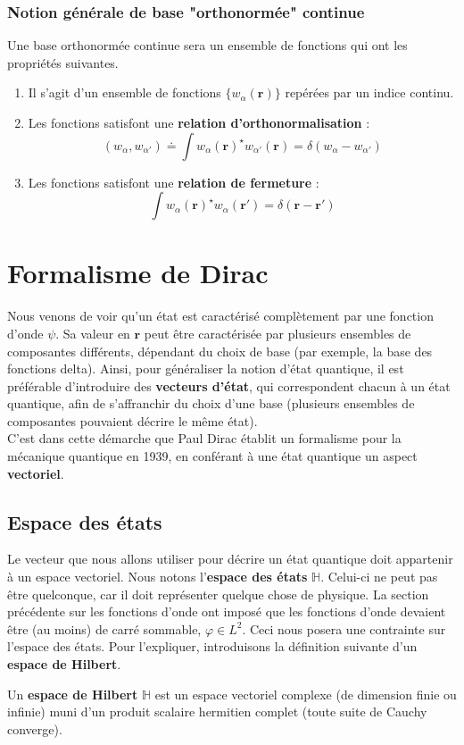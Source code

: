 \documentclass[../notesdecours.tex]{subfiles}
\begin{document}
\subsubsection{Notion générale de base "orthonormée" continue}
Une base orthonormée continue sera un ensemble de fonctions qui ont les propriétés suivantes.
\begin{enumerate}
\item Il s'agit d'un ensemble de fonctions $\{ w_\alpha(\bm{r})\}$ repérées par un indice continu. \\

\item Les fonctions satisfont une \textbf{relation d'orthonormalisation} :
$$(w_{\alpha}, w_{\alpha'}) \doteq \int w_{\alpha}(\bm{r})^\star w_{\alpha'}(\bm{r}) = \delta(w_{\alpha} - w_{\alpha'})$$

\item Les fonctions satisfont une \textbf{relation de fermeture} :
$$\int w_{\alpha}(\bm{r})^\star w_{\alpha}(\bm{r}') = \delta(\bm{r}-\bm{r}')$$
\end{enumerate}
\section{Formalisme de Dirac}
Nous venons de voir qu'un état est caractérisé complètement par une fonction d'onde $\psi$. Sa valeur en $\bm{r}$ peut être caractérisée par plusieurs ensembles de composantes différents, dépendant du choix de base (par exemple, la base des fonctions delta). Ainsi, pour généraliser la notion d'état quantique, il est préférable d'introduire des \textbf{vecteurs d'état}, qui correspondent chacun à un état quantique, afin de s'affranchir du choix d'une base (plusieurs ensembles de composantes pouvaient décrire le même état). \\

C'est dans cette démarche que Paul Dirac établit un formalisme pour la mécanique quantique en 1939, en conférant à une état quantique un aspect \textbf{vectoriel}. 
\subsection{Espace des états}
Le vecteur que nous allons utiliser pour décrire un état quantique doit appartenir à un espace vectoriel. Nous notons l'\textbf{espace des états} $\mathbb{H}$. Celui-ci ne peut pas être quelconque, car il doit représenter quelque chose de physique. La section précédente sur les fonctions d'onde ont imposé que les fonctions d'onde devaient être (au moins) de carré sommable, $\varphi \in L^2$. Ceci nous posera une contrainte sur l'espace des états. Pour l'expliquer, introduisons la définition suivante d'un \textbf{espace de Hilbert}.
\begin{definition}
	Un \textbf{espace de Hilbert} $\mathbb{H}$ est un espace vectoriel complexe (de dimension finie ou infinie) muni d'un produit scalaire hermitien complet (toute suite de Cauchy converge).
\end{definition}
\end{document}
